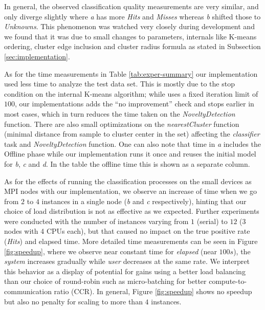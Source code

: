 In general, the observed classification quality measurements are very similar,
and only diverge slightly where \emph{a} has more \emph{Hits} and \emph{Misses}
whereas \emph{b} shifted those to \emph{Unknowns}.
This phenomenon was watched very closely during development and we found that it was due to
small changes to \minas parameters, \minas internals like K-means ordering,
cluster edge inclusion and cluster radius formula as stated in
Subsection \ref{sec:implementation}.

As for the time measurements in Table \ref{tab:exper-summary}
our implementation used less time to analyze the test data set.
This is mostly due to 
the stop condition
on the internal K-means algorithm; while  uses a fixed iteration
limit of $100$, our implementations adds the ``no improvement'' check
and stops earlier in most cases, which in turn reduces the time taken
on the \emph{NoveltyDetection} function.
There are also small optimizations on the \emph{nearestCluster} function
(minimal distance from sample to cluster center in the set)
affecting the \emph{classifier} task and \emph{NoveltyDetection} function.
One can also note that  time in \emph{a} includes the Offline phase while our
implementation runs it once and reuses the initial model for \emph{b}, \emph{c}
and \emph{d}. In the table the offline time this is shown as a separate column.

As for the effects of running the classification processes on the small devices as MPI nodes with our implementation, we observe
an increase of time when we go from $2$ to $4$ instances in a single node
(\emph{b} and \emph{c} respectively), hinting that our choice of load
distribution is not as effective as we expected.
Further experiments were conducted with the number of instances varying from $1$ (serial) to
$12$ (3 nodes with 4 CPUs each), but that caused no impact on the true positive rate (\emph{Hits}) and elapsed time.
More detailed time measurements can be seen in Figure \ref{fig:speedup},
where we observe near constant time for \emph{elapsed} (near $100s$),
the \emph{system} increases gradually while \emph{user} decreases at the same rate.
We interpret this behavior as a display of potential for gains using a better
load balancing than our choice of round-robin such as micro-batching for better
compute-to-communication ratio (CCR).
In general, Figure \ref{fig:speedup} shows no speedup but also no penalty for
scaling to more than $4$ instances.

